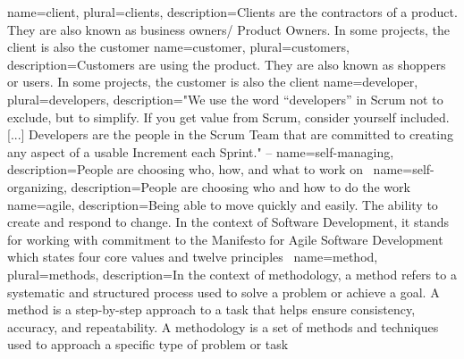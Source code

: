 
{
    name=client,
    plural={clients},
    description={Clients are the contractors of a product. They are also known as business owners/ Product Owners. In some projects, the client is also the customer}
}
{
    name=customer,
    plural={customers},
    description={Customers are using the product. They are also known as shoppers or users. In some projects, the customer is also the client}
}
{
    name=developer,
    plural={developers},
    description={"We use the word “developers” in Scrum not to exclude, but to simplify. If you get value from Scrum, consider yourself included. [...] Developers are the people in the Scrum Team that are committed to creating any aspect of a usable Increment each Sprint." -- }
}
{
    name={self-managing},
    description={People are choosing who, how, and what to work on~\cite[Changes between 2017 and 2020 Scrum Guides]{Schwaber2020SGR}}
}
{
    name={self-organizing},
    description={People are choosing who and how to do the work~\cite[Changes between 2017 and 2020 Scrum Guides]{Schwaber2020SGR}}
}
{
    name={agile},
    description={Being able to move quickly and easily. The ability to create and respond to change. In the context of Software Development, it stands for working with commitment to the Manifesto for Agile Software Development which states four core values and twelve principles~\cite{Beck2001MfA}}
}
{
    name={method},
    plural={methods},
    description={In the context of methodology, a method refers to a systematic and structured process used to solve a problem or achieve a goal. A method is a step-by-step approach to a task that helps ensure consistency, accuracy, and repeatability. A methodology is a set of methods and techniques used to approach a specific type of problem or task~\cite{Cooper2018MVP}}
}

